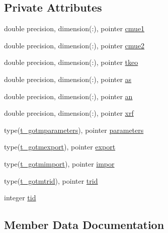 \subsection*{Private Attributes}
\begin{DoxyCompactItemize}
\item 
double precision, dimension(\+:), pointer \mbox{\hyperlink{structmodulegotm_1_1t__gotm_a8a588c886e26c4c0d25297bb15aa60d1}{cmue1}}
\item 
double precision, dimension(\+:), pointer \mbox{\hyperlink{structmodulegotm_1_1t__gotm_a3664506ca4218d82035943501de53364}{cmue2}}
\item 
double precision, dimension(\+:), pointer \mbox{\hyperlink{structmodulegotm_1_1t__gotm_ad375783e21d1b4aa197c39ef7eae767d}{tkeo}}
\item 
double precision, dimension(\+:), pointer \mbox{\hyperlink{structmodulegotm_1_1t__gotm_a7aa98bcf0814bc12d75c8f29c10ef188}{as}}
\item 
double precision, dimension(\+:), pointer \mbox{\hyperlink{structmodulegotm_1_1t__gotm_a5847e1efd4bb7e95fb86cdd83c5aae26}{an}}
\item 
double precision, dimension(\+:), pointer \mbox{\hyperlink{structmodulegotm_1_1t__gotm_a73ec7281348a98699997f11225986154}{xrf}}
\item 
type(\mbox{\hyperlink{structmodulegotm_1_1t__gotmparameters}{t\+\_\+gotmparameters}}), pointer \mbox{\hyperlink{structmodulegotm_1_1t__gotm_a0606b3ddcbfd4cea6f64b77638d8715a}{parameters}}
\item 
type(\mbox{\hyperlink{structmodulegotm_1_1t__gotmexport}{t\+\_\+gotmexport}}), pointer \mbox{\hyperlink{structmodulegotm_1_1t__gotm_aafeb491232b8a1d63f75b06b089fe212}{export}}
\item 
type(\mbox{\hyperlink{structmodulegotm_1_1t__gotmimport}{t\+\_\+gotmimport}}), pointer \mbox{\hyperlink{structmodulegotm_1_1t__gotm_af4cdc9d5147f5c1fd7e519e6c6b6323d}{impor}}
\item 
type(\mbox{\hyperlink{structmodulegotm_1_1t__gotmtrid}{t\+\_\+gotmtrid}}), pointer \mbox{\hyperlink{structmodulegotm_1_1t__gotm_a7ba6a8d015fac16070cc29bf0425ec8a}{trid}}
\item 
integer \mbox{\hyperlink{structmodulegotm_1_1t__gotm_a5e7403d5767213a02c21254ee9a2c5d0}{tid}}
\end{DoxyCompactItemize}


\subsection{Member Data Documentation}
\mbox{\label{structmodulegotm_1_1t__gotm_a5847e1efd4bb7e95fb86cdd83c5aae26}} 
